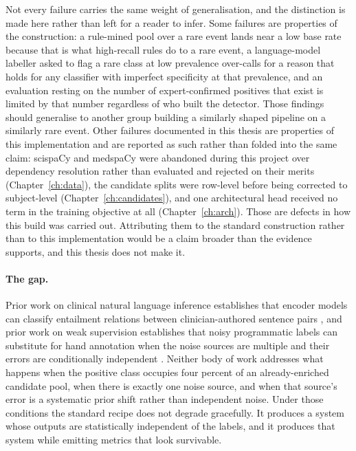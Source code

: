 Not every failure carries the same weight of generalisation, and the
distinction is made here rather than left for a reader to infer. Some
failures are properties of the construction: a rule-mined pool over a rare
event lands near a low base rate because that is what high-recall rules do to
a rare event, a language-model labeller asked to flag a rare class at low
prevalence over-calls for a reason that holds for any classifier with
imperfect specificity at that prevalence, and an evaluation resting on the
number of expert-confirmed positives that exist is limited by that number
regardless of who built the detector. Those findings should generalise to
another group building a similarly shaped pipeline on a similarly rare event.
Other failures documented in this thesis are properties of this
implementation and are reported as such rather than folded into the same
claim: scispaCy and medspaCy were abandoned during this project over
dependency resolution rather than evaluated and rejected on their merits
(Chapter~\ref{ch:data}), the candidate splits were row-level before being
corrected to subject-level (Chapter~\ref{ch:candidates}), and one architectural
head received no term in the training objective at all
(Chapter~\ref{ch:arch}). Those are defects in how this build was carried out.
Attributing them to the standard construction rather than to this
implementation would be a claim broader than the evidence supports, and this
thesis does not make it.

\paragraph{The gap.} Prior work on clinical natural language inference
establishes that encoder models can classify entailment relations between
clinician-authored sentence pairs \citep{romanov2018mednli}, and prior work on
weak supervision establishes that noisy programmatic labels can substitute for
hand annotation when the noise sources are multiple and their errors are
conditionally independent \citep{ratner2016dataprogramming,ratner2017snorkel}.
Neither body of work addresses what happens when the positive class occupies
four percent of an already-enriched candidate pool, when there is exactly one
noise source, and when that source's error is a systematic prior shift rather
than independent noise. Under those conditions the standard recipe does not
degrade gracefully. It produces a system whose outputs are statistically
independent of the labels, and it produces that system while emitting metrics
that look survivable.

